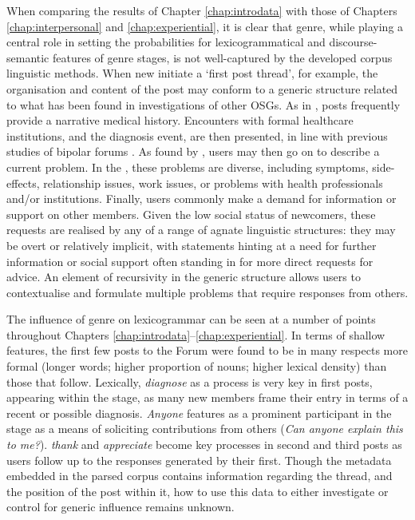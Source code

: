 When comparing the results of Chapter \ref{chap:introdata} with those of Chapters \ref{chap:interpersonal} and \ref{chap:experiential}, it is clear that genre, while playing a central role in setting the probabilities for lexicogrammatical and \gls{discourse-semantic} features of genre stages, is not well\hyp{}captured by the developed corpus linguistic methods. When new  initiate a `first \gls{post} \gls{thread}', for example, the organisation and content of the \gls{post} may conform to a generic structure related to what has been found in investigations of other \glspl{OSG}. As in \textcite{varga2014grieving}, \glspl{post} frequently provide a narrative medical history. Encounters with formal healthcare institutions, and the diagnosis event, are then presented, in line with previous studies of bipolar \glspl{forum} \cite[e.g.][]{vayreda_social_2009}. As found by \textcite{horne_doing_2009}, users may then go on to describe a current problem. In the , these problems are diverse, including symptoms, side\hyp{}effects, relationship issues, work issues, or problems with health professionals and\slash or institutions. Finally, users commonly make a demand for information or support on other members. Given the low social status of newcomers, these requests are realised by any of a range of agnate linguistic structures: they may be overt or relatively implicit, with statements hinting at a need for further information or social support often standing in for more direct requests for advice. An element of recursivity in the generic structure allows users to contextualise and formulate multiple problems that require responses from others.

The influence of genre on lexicogrammar can be seen at a number of points throughout Chapters \ref{chap:introdata}--\ref{chap:experiential}. In terms of shallow features, the first few \glspl{post} to the \gls{Forum} were found to be in many respects more formal (longer words; higher proportion of nouns; higher lexical density) than those that follow. Lexically, \emph{diagnose} as a process is very key in first \glspl{post}, appearing within the  stage, as many new \glspl{member} frame their entry in terms of a recent or possible diagnosis. \emph{Anyone} features as a prominent participant in the  stage as a means of soliciting contributions from others (\emph{Can anyone explain this to me?}). \emph{thank} and \emph{appreciate} become key processes in second and third posts as users follow up to the responses generated by their first. Though the metadata embedded in the parsed corpus contains information regarding the thread, and the position of the \gls{post} within it, how to use this data to either investigate or control for generic influence remains unknown.

